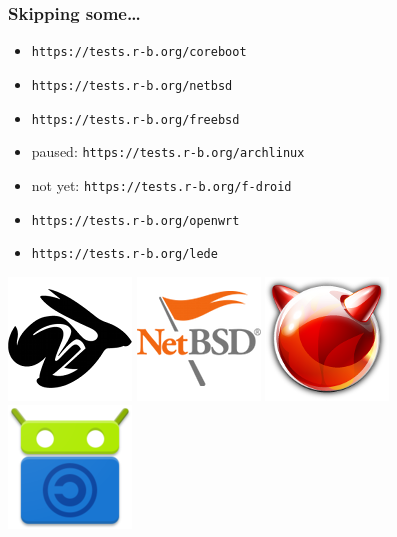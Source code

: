 \documentclass[14pt]{beamer}
\begin{document}
\begin{frame}
 \frametitle{Skipping some…}
 \begin{itemize}
  \item \texttt{https://tests.r-b.org/coreboot}
  \item \texttt{https://tests.r-b.org/netbsd}
  \item \texttt{https://tests.r-b.org/freebsd}
  \item paused: \texttt{https://tests.r-b.org/archlinux}
  \item not yet: \texttt{https://tests.r-b.org/f-droid}
  \item \texttt{https://tests.r-b.org/openwrt}
  \item \texttt{https://tests.r-b.org/lede}
 \end{itemize}
 \begin{center}
  \includegraphics[height=0.13\paperheight]{images/coreboot.png}
  \hspace{0.05\paperwidth}
  \includegraphics[height=0.13\paperheight]{images/netbsd.png}
  \hspace{0.05\paperwidth}
  \includegraphics[height=0.13\paperheight]{images/freebsd.png}
  \hspace{0.05\paperwidth}
  \includegraphics[height=0.13\paperheight]{images/f-droid.png}

\end{center}
\end{frame}
\end{document}
